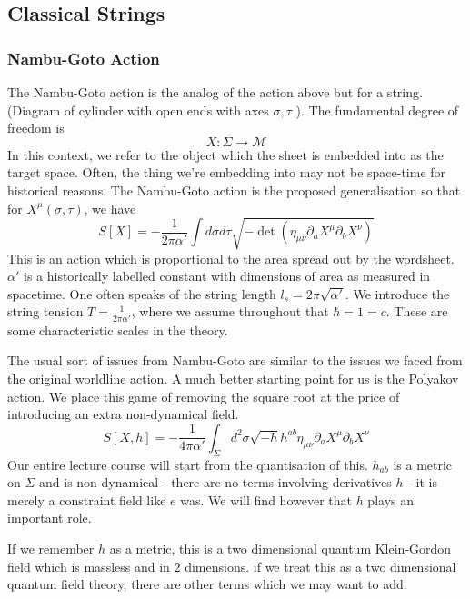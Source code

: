 \documentclass[11pt, oneside]{article}   	%
\theoremstyle{slanted}
\begin{document}
\subsection{Classical Strings}
\subsubsection{Nambu-Goto Action}
The Nambu-Goto action 
is the analog of the action above 
but for a string. 
(Diagram of cylinder with open ends with axes $ \sigma , \tau $ ). 
The fundamental degree of freedom is 
\[
 X : \Sigma \to \mathcal{ M } 
\] In this context, we refer to the object which 
the sheet is embedded into as the target space. 
Often, the thing we're embedding into may not 
be space-time for historical reasons. 
The Nambu-Goto action 
is the proposed generalisation 
so that for $ X ^ \mu \left( \sigma , \tau  \right)  $, we have 
\[
 S \left[  X  \right] =  - \frac{1}{2 \pi \alpha '  } 
 \int d \sigma d \tau \sqrt{  - \det \left( \eta _{ \mu \nu } \partial  _ a X ^ \mu 
 \partial  _ b X ^ \nu \right) } 

\] This is an action which 
is proportional to the area 
spread out by the wordsheet. 
$ \alpha  ' $ is a historically labelled 
constant with dimensions of area as measured in 
spacetime. 
One often speaks of the string length $ l _s = 2 \pi \sqrt{ \alpha ' } $. 
We introduce the string tension $ T  = \frac{1}{ 2 \pi \alpha ' } $, 
where we assume throughout that $ \hbar = 1  =c  $. 
These are some characteristic scales in the 
theory. 

The usual sort of issues from Nambu-Goto 
are similar to the issues we faced from 
the original worldline action. 
A much better starting point 
for us is the Polyakov action. 
We place this game of removing the 
square root at the price of introducing an 
extra non-dynamical field. 
\[
 S\left[  X, h   \right] =  - \frac{1}{ 4 \pi \alpha ' } 
 \int _{ \Sigma } d ^ 2 \sigma \sqrt{  -h }  h ^{ ab } \eta _{ \mu \nu } 
 \partial  _ a X ^ \mu \partial  _ b X ^ \nu 
\]  Our entire lecture course 
will start from the 
quantisation of this. 
$ h _{ ab } $ is a metric on  $ \Sigma $ and is 
non-dynamical  - there are no terms 
involving derivatives $ h$ - it is 
merely a constraint field like $ e $ was. 
We will find however that $ h $ plays 
an important role. 

If we remember $ h $ as a metric, 
this is a two dimensional quantum Klein-Gordon 
field which is massless and in $ 2 $ dimensions. 
if we treat this as a two dimensional quantum field theory, 
there are other terms which we may want to add. 
\end{document}
